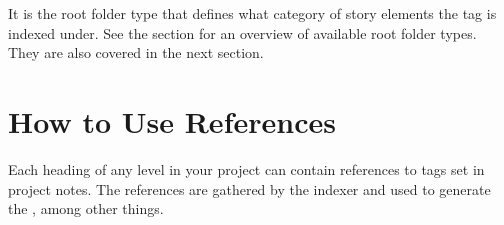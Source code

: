 \documentclass[a4paper,11pt,english]{sphinxmanual}
\begin{document}
\sphinxAtStartPar
It is the root folder type that defines what category of story elements the tag is indexed under.
See the {\hyperref[\detokenize{project_overview:a-proj-roots}]{}} section for an overview of available root folder types. They are also
covered in the next section.


\section{How to Use References}
\label{\detokenize{project_references:how-to-use-references}}\label{\detokenize{project_references:a-references-references}}
\sphinxAtStartPar
Each heading of any level in your project can contain references to tags set in project notes. The
references are gathered by the indexer and used to generate the , among other
things.
\end{document}
